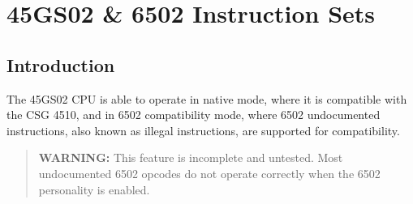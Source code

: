 \begingroup
{}
\newcommand{\OPC}[4]{\makecell{\begin{tabular}{>{\raggedright\arraybackslash}p{0.4cm}>{\raggedleft\arraybackslash}p{0.8cm}}
\fontsize{8pt}{0pt}\selectfont #3 & \fontsize{8pt}{0pt}\selectfont {\em #4} \\[-3pt]
\multicolumn{2}{c}{\fontsize{10pt}{0pt}\selectfont #1} \\[-3pt]
\multicolumn{2}{c}{\fontsize{8pt}{0pt}\selectfont #2}
\end{tabular}}}
\newcommand{\OPCQ}[4]{\makecell{\begin{tabular}{>{\raggedright\arraybackslash}p{0.4cm}>{\raggedleft\arraybackslash}p{0.8cm}}
\fontsize{8pt}{0pt}\selectfont #3 & \fontsize{8pt}{0pt}\selectfont {\em #4} \\[-3pt]
\multicolumn{2}{c}{\fontsize{10pt}{0pt}\selectfont #1} \\[-3pt]
\multicolumn{2}{c}{\fontsize{8pt}{0pt}\selectfont #2} \\[-12pt]
\fontsize{8pt}{0pt}\selectfont Q
\end{tabular}}}
\newcommand{\OPill}{\cellcolor[rgb]{1,.8,.8}}
\newcommand{\OPfar}{\cellcolor[rgb]{.8,1,.8}}
\newcommand{\OPquad}{\cellcolor[rgb]{.8,.8,1}}
\newcommand{\OPfarq}{\cellcolor[rgb]{.8,1,1}}
\newcommand{\binand}{$\mathit{AND}$}
\newcommand{\binor}{$\mathit{OR}$}
\newcommand{\binxor}{$\mathit{XOR}$}
\newcommand{\binnot}{$\mathit{NOT}$}
\newcommand{\binneg}{$\mathit{NEG}$}

\chapter{45GS02 \& 6502 Instruction Sets}

\section{Introduction}

The 45GS02 CPU is able to operate in native mode, where it
is compatible with the CSG 4510, and in 6502 compatibility mode,
where 6502 undocumented instructions, also known as illegal
instructions, are supported for compatibility.

\begin{quote}
{\bf WARNING:} This feature is incomplete and untested.  Most undocumented
6502 opcodes do not operate correctly when the 6502 personality is enabled.
\end{quote}

